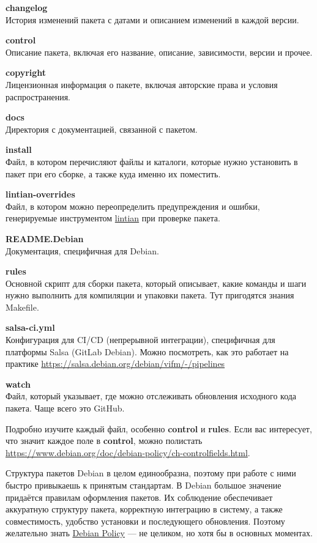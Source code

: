 \textbf{changelog}\\
История изменений пакета с датами и описанием изменений в каждой версии.

\textbf{control}\\
Описание пакета, включая его название, описание, зависимости, версии и прочее.

\textbf{copyright}\\
Лицензионная информация о пакете, включая авторские права и условия
распространения.

\textbf{docs}\\
Директория с документацией, связанной с пакетом.

\textbf{install}\\
Файл, в котором перечисляют файлы и каталоги, которые нужно установить в пакет
при его сборке, а также куда именно их поместить.

\textbf{lintian-overrides}\\
Файл, в котором можно переопределить предупреждения и ошибки, генерируемые
инструментом
\href{https://manpages.debian.org/testing/lintian/lintian.1.en.html}{lintian}
при проверке пакета.

\textbf{README.Debian}\\
Документация, специфичная для Debian.

\textbf{rules}\\
Основной скрипт для сборки пакета, который описывает, какие команды и шаги нужно
выполнить для компиляции и упаковки пакета. Тут пригодятся знания Makefile.

\textbf{salsa-ci.yml}\\
Конфигурация для CI/CD (непрерывной интеграции), специфичная для платформы Salsa
(GitLab Debian). Можно посмотреть, как это работает на практике
\url{https://salsa.debian.org/debian/vifm/-/pipelines}

\textbf{watch}\\
Файл, который указывает, где можно отслеживать обновления исходного кода пакета.
Чаще всего это GitHub.

Подробно изучите каждый файл, особенно \textbf{control} и \textbf{rules}. Если
вас интересует, что значит каждое поле в \textbf{control}, можно полистать
\url{https://www.debian.org/doc/debian-policy/ch-controlfields.html}.

Структура пакетов Debian в целом единообразна, поэтому при работе с ними быстро
привыкаешь к принятым стандартам. В Debian большое значение придаётся правилам
оформления пакетов. Их соблюдение обеспечивает аккуратную структуру пакета,
корректную интеграцию в систему, а также совместимость, удобство установки и
последующего обновления. Поэтому желательно знать
\href{https://www.debian.org/doc/debian-policy/}{Debian Policy} --- не целиком,
но хотя бы в основных моментах.

\vspace{20cm}
